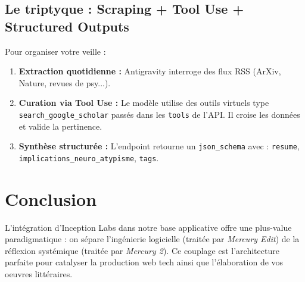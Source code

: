 \documentclass[12pt,a4paper]{article}
\begin{document}
\subsection{Le triptyque : Scraping + Tool Use + Structured Outputs}
Pour organiser votre veille :
\begin{enumerate}
    \item \textbf{Extraction quotidienne :} Antigravity interroge des flux RSS (ArXiv, Nature, revues de psy...).
    \item \textbf{Curation via Tool Use :} Le modèle utilise des outils virtuels type \texttt{search\_google\_scholar} passés dans les \texttt{tools} de l'API. Il croise les données et valide la pertinence.
    \item \textbf{Synthèse structurée :} L'endpoint retourne un \texttt{json\_schema} avec : \texttt{resume}, \texttt{implications\_neuro\_atypisme}, \texttt{tags}.
\end{enumerate}

\section{Conclusion}

L'intégration d'Inception Labs dans notre base applicative offre une plus-value paradigmatique : on sépare l'ingénierie logicielle (traitée par \textit{Mercury Edit}) de la réflexion systémique (traitée par \textit{Mercury 2}). Ce couplage est l'architecture parfaite pour catalyser la production web tech ainsi que l'élaboration de vos oeuvres littéraires.
\end{document}
